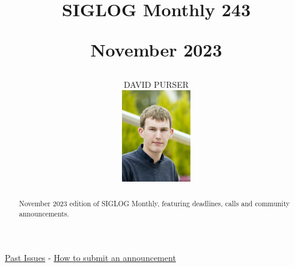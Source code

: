 \documentclass[prodmode,acmtecs]{acmsmall} %
\newcounter{colstart}
\begin{document}
\setcounter{colstart}{\thepage}

\title{{\huge\sc SIGLOG Monthly 243}

 November 2023}
\author{DAVID PURSER
\vspace*{-2.6cm}\begin{flushright}\includegraphics[width=30mm]{dp}\end{flushright}
}

\begin{abstract}
November 2023 edition of SIGLOG Monthly, featuring deadlines, calls and community announcements.
\end{abstract}


\maketitlee

\href{https://lics.siglog.org/newsletters/}{Past Issues}
 - 
\href{https://lics.siglog.org/newsletters/inst.html}{How to submit an announcement}
\end{document}
